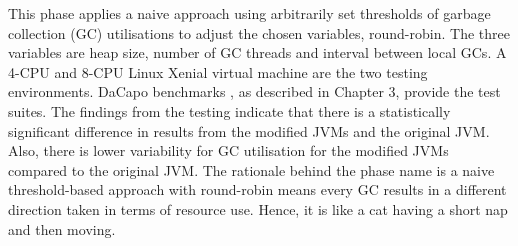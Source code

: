 This phase applies a naive approach using arbitrarily set thresholds of garbage collection
(GC) utilisations to adjust the chosen variables, round-robin. The three
variables are heap size, number of GC threads and interval between local
GCs. A 4-CPU and 8-CPU Linux Xenial virtual machine are the
two testing environments. DaCapo benchmarks \cite{blackburn2006dacapo}, as described in Chapter 3,
provide the test suites.
\newline\newline
The findings from the testing indicate that there is a statistically
significant difference in results from the modified JVMs and the
original JVM. Also, there is lower variability for GC utilisation for
the modified JVMs compared to the original JVM.
\newline\newline
The rationale behind the phase name is a naive threshold-based approach
with round-robin means every GC results in a different direction taken
in terms of resource use. Hence, it is like a cat having a short nap and
then moving.

